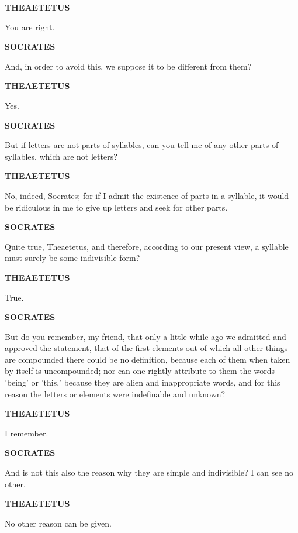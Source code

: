 \documentclass[11pt,letter]{article}
\begin{document}
\par \textbf{THEAETETUS}
\par   You are right.

\par \textbf{SOCRATES}
\par   And, in order to avoid this, we suppose it to be different from them?

\par \textbf{THEAETETUS}
\par   Yes.

\par \textbf{SOCRATES}
\par   But if letters are not parts of syllables, can you tell me of any other parts of syllables, which are not letters?

\par \textbf{THEAETETUS}
\par   No, indeed, Socrates; for if I admit the existence of parts in a syllable, it would be ridiculous in me to give up letters and seek for other parts.

\par \textbf{SOCRATES}
\par   Quite true, Theaetetus, and therefore, according to our present view, a syllable must surely be some indivisible form?

\par \textbf{THEAETETUS}
\par   True.

\par \textbf{SOCRATES}
\par   But do you remember, my friend, that only a little while ago we admitted and approved the statement, that of the first elements out of which all other things are compounded there could be no definition, because each of them when taken by itself is uncompounded; nor can one rightly attribute to them the words 'being' or 'this,' because they are alien and inappropriate words, and for this reason the letters or elements were indefinable and unknown?

\par \textbf{THEAETETUS}
\par   I remember.

\par \textbf{SOCRATES}
\par   And is not this also the reason why they are simple and indivisible? I can see no other.

\par \textbf{THEAETETUS}
\par   No other reason can be given.
\end{document}
